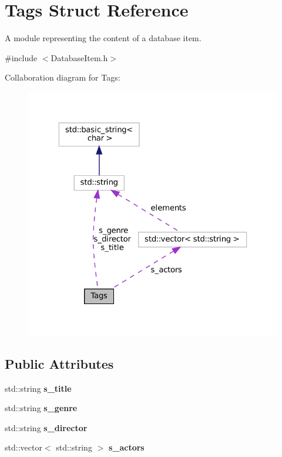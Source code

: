 \hypertarget{structTags}{}\section{Tags Struct Reference}
\label{structTags}


A module representing the content of a database item.  




{\ttfamily \#include $<$Database\+Item.\+h$>$}



Collaboration diagram for Tags\+:
\nopagebreak
\begin{figure}[H]
\begin{center}
\leavevmode
\includegraphics[width=323pt]{structTags__coll__graph}
\end{center}
\end{figure}
\subsection*{Public Attributes}
\begin{DoxyCompactItemize}
\item 
\mbox{\label{structTags_a0af72a04b35ff5bfb11e9e602a25697c}} 
std\+::string {\bfseries s\+\_\+title}
\item 
\mbox{\label{structTags_ab983fc193a143dbd70b38a8e36f90ffb}} 
std\+::string {\bfseries s\+\_\+genre}
\item 
\mbox{\label{structTags_abd09416d0ce431b76adfc931b26738d9}} 
std\+::string {\bfseries s\+\_\+director}
\item 
\mbox{\label{structTags_a94e73b49ee3c2acf33cc109a1411e45a}} 
std\+::vector$<$ std\+::string $>$ {\bfseries s\+\_\+actors}
\end{DoxyCompactItemize}



